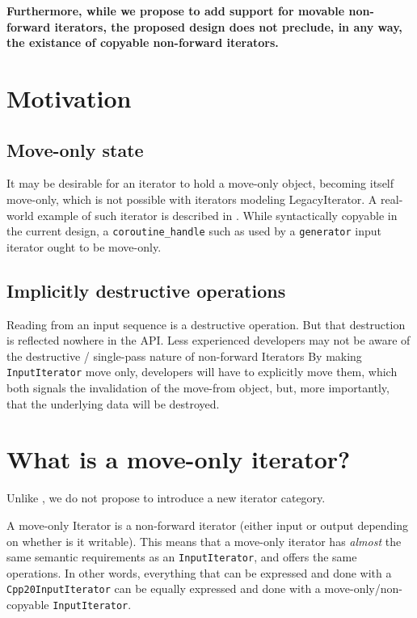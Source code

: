 \documentclass{wg21}
\begin{document}
\textbf{Furthermore, while we propose to add support for movable
	non-forward iterators, the proposed design does not preclude, in any
	way, the existance of copyable non-forward iterators.}

\hypertarget{motivation}{%
	\section{Motivation}\label{motivation}}

\hypertarget{move-only-state}{%
	\subsection{Move-only state}\label{move-only-state}}

It may be desirable for an iterator to hold a move-only object, becoming
itself move-only, which is not possible with iterators modeling
LegacyIterator. A real-world example of such iterator is described in
\cite{P0902}. While syntactically copyable in the current design,
a \texttt{coroutine\_handle} such as used by a \texttt{generator} input
iterator ought to be move-only.

\hypertarget{implicitly-destructive-operations}{%
	\subsection{Implicitly destructive
		operations}\label{implicitly-destructive-operations}}

Reading from an input sequence is a destructive operation. But that
destruction is reflected nowhere in the API. Less experienced developers
may not be aware of the destructive / single-pass nature of non-forward
Iterators By making \texttt{InputIterator} move only, developers will
have to explicitly move them, which both signals the invalidation of the
move-from object, but, more importantly, that the underlying data will
be destroyed.

\hypertarget{what-is-a-move-only-iterator}{%
	\section{What is a move-only
		iterator?}\label{what-is-a-move-only-iterator}}

Unlike \cite{P0902}, we do not propose to introduce a new
iterator category.

A move-only Iterator is a non-forward iterator (either input or output
depending on whether is it writable). This means that a move-only
iterator has \emph{almost} the same semantic requirements as an
\texttt{InputIterator}, and offers the same operations. In other words,
everything that can be expressed and done with a
\texttt{Cpp20InputIterator} can be equally expressed and done with a
move-only/non-copyable \texttt{InputIterator}.
\end{document}
